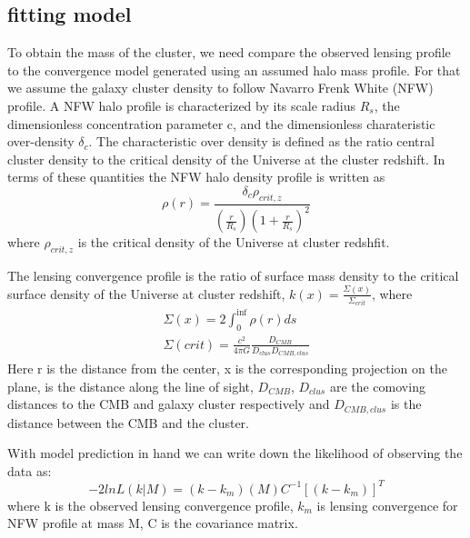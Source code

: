  \subsection{fitting model}
To obtain the mass of the cluster, we need compare the observed lensing profile to the convergence model generated using an assumed halo mass profile.
 For that we assume the galaxy cluster density to follow Navarro Frenk White (NFW) profile.
 A NFW halo profile is characterized by its scale radius $R_{s}$, the dimensionless concentration parameter c, and the dimensionless charateristic over-density $\delta_{c}$.
 The characteristic over density is defined as the ratio central cluster density to the critical density of the Universe at the cluster redshift.
 In terms of these quantities the NFW halo density profile is written as 
 \begin{equation}
 \rho(r) = \frac{\delta_{c}\rho_{crit,z}}{(\frac{r}{R_{s}})(1 + \frac{r}{R_{s}})^{2}}
 \end{equation} 
 where $\rho_{crit,z}$ is the critical density of the Universe at cluster redshfit.
 
 The lensing convergence profile is the ratio of surface mass density to the critical surface density of the Universe at cluster redshift, $k(x) = \frac{\Sigma(x)}{\Sigma_{crit}}$, where
 \begin{eqnarray}
 \Sigma(x) = 2 \int^{\inf}_{0} \rho(r) ds\\
 \Sigma(crit) = \frac{c^{2}}{4\pi G} \frac{D_{CMB}}{D_{clus} D_{CMB,clus}} 
 \end{eqnarray} 
Here r is the distance from the center, x is the corresponding projection on the plane, is the distance along the line of sight, $D_{CMB}$, $D_{clus}$ are the comoving distances to the CMB and galaxy cluster respectively and $D_{CMB,clus}$ is the distance between the CMB and the cluster.


With model prediction in hand we can write down the likelihood of observing the data as:
\begin{equation}
-2 ln L (k | M) = (k - k_{m})(M) C^{-1} [(k - k_{m})]^{T}
\end{equation}
where k is the observed lensing convergence profile, $k_{m}$ is lensing convergence for NFW profile at mass M, C is the covariance matrix. 

